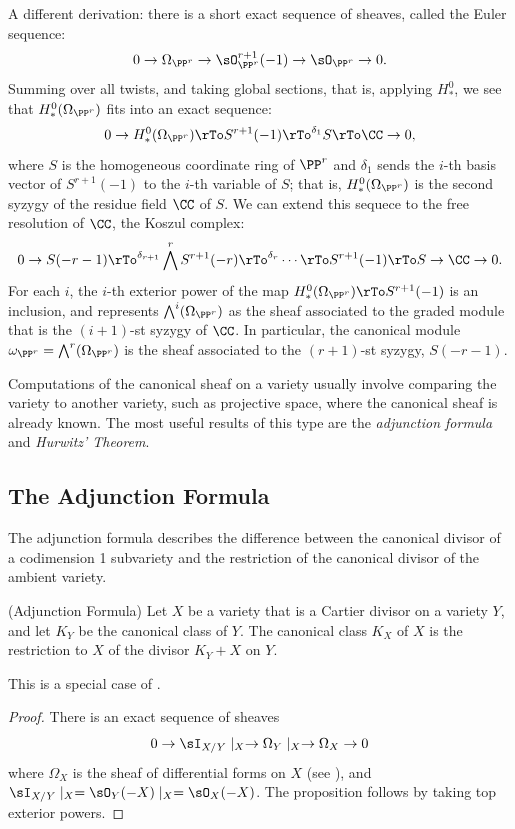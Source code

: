 \begin{fact}
A different derivation: there is a short exact sequence of sheaves, called the Euler sequence:
$$
0\to \Omega_{\PP^{r}} \to \sO_{\PP^{r}}^{r+1} (-1) \to \sO_{\PP^{r}} \to 0.
$$
Summing over all twists, and taking global sections, that is, applying $H^0_*$, we see that 
$H^0_*(\Omega_{\PP^{r}})$ fits into an exact sequence:
$$
0 \to H^0_*(\Omega_{\PP^{r}}) \rTo S^{r+1}(-1) \rTo^{\delta_{1}} S \rTo \CC \to 0,
$$
where $S$ is the homogeneous coordinate ring of $\PP^r$ and $\delta_1$ sends the $i$-th basis vector of
$S^{r+1}(-1)$ to the $i$-th variable of $S$; that is, $H^0_*(\Omega_{\PP^{r}})$ is the second syzygy of the residue field $\CC$ of $S$. We can extend this sequece to  the free resolution
of $\CC$, the Koszul complex:
$$
0 \to S(-r-1) \rTo^{\delta_{r+1}} \bigwedge^rS^{r+1}(-r) \rTo^{\delta_{r}} \cdots \rTo S^{r+1}(-1) \rTo S \to \CC \to 0.
$$
For each $i$, the $i$-th exterior power of the map $H^0_*(\Omega_{\PP^{r}}) \rTo S^{r+1}(-1)$ is an inclusion, and
represents $\bigwedge^i(\Omega_{\PP^{r}})$ as the sheaf associated to the graded module that is the $(i+1)$-st syzygy of $\CC$.
In particular, the canonical module $\omega_{\PP^r} = \bigwedge^r(\Omega_{\PP^{r}})$ is the sheaf associated to the 
$(r+1)$-st syzygy, $S(-r-1)$.
\end{fact}

Computations of the canonical sheaf on a variety usually involve comparing the variety to another variety, such as projective space, where the canonical sheaf is already known. The most useful results of this type are  the \emph{adjunction formula}
and \emph{Hurwitz' Theorem}. 

\subsection{The Adjunction Formula}\label{Adjunction Formula}

The adjunction formula describes the difference between the canonical divisor of
a codimension 1 subvariety and the restriction of the canonical divisor of the ambient variety.


\begin{proposition}\label{adjunction}(Adjunction Formula)
 Let $X$ be a variety that is a Cartier divisor on a variety $Y$, and let $K_{Y}$ be the canonical class of $Y$. The canonical class $K_X$ of $X$ is
 the restriction to $X$ of the divisor $K_{Y}+X$ on $Y$.
\end{proposition}
This is a special case of \cite[****]{H}.
\begin{proof}
 There is an exact sequence of sheaves
 $$
0\to  \sI_{X/Y}\mid_{X} \to \Omega_{Y}\mid _{X} \to \Omega_{X} \to 0
 $$
 where $\Omega_{X}$ is the sheaf of differential forms on $X$ (see \cite[Theorem ***]{Eisenbud95}), and
$ \sI_{X/Y}\mid_{X} = \sO_{Y}(-X)\mid_{X} = \sO_{X}(-X)$. The proposition follows by taking top exterior powers.
\end{proof}

